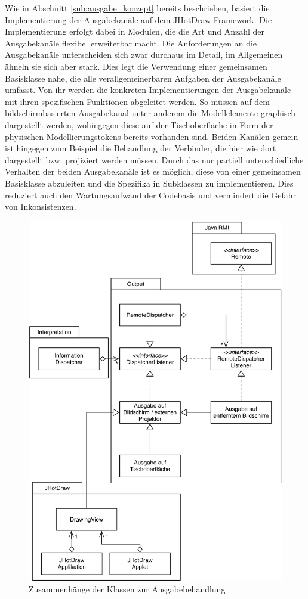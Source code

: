 Wie in Abschnitt \ref{sub:ausgabe_konzept} bereits beschrieben, basiert die Implementierung der Ausgabekanäle auf dem JHotDraw-Framework. Die Implementierung erfolgt dabei in Modulen, die die Art und Anzahl der Ausgabekanäle flexibel erweiterbar macht. Die Anforderungen an die Ausgabekanäle unterscheiden sich zwar durchaus im Detail, im Allgemeinen ähneln sie sich aber stark. Dies legt die Verwendung einer gemeinsamen Basisklasse nahe, die alle verallgemeinerbaren Aufgaben der Ausgabekanäle umfasst. Von ihr werden die konkreten Implementierungen der Ausgabekanäle mit ihren spezifischen Funktionen abgeleitet werden. So müssen auf dem bildschirmbasierten Ausgabekanal unter anderem die Modellelemente graphisch dargestellt werden, wohingegen diese auf der Tischoberfläche in Form der physischen Modellierungstokens bereits vorhanden sind. Beiden Kanälen gemein ist hingegen zum Beispiel die Behandlung der Verbinder, die hier wie dort dargestellt bzw. projiziert werden müssen. Durch das nur partiell unterschiedliche Verhalten der beiden Ausgabekanäle ist es möglich, diese von einer gemeinsamen Basisklasse abzuleiten und die Spezifika in Subklassen zu implementieren. Dies reduziert auch den Wartungsaufwand der Codebasis und vermindert die Gefahr von Inkonsistenzen. 

\begin{figure}[htbp]
	\centering
		\includegraphics[height=\textheight]{img/ImplementierungOutput/OutputClasses.png}
	\caption{Zusammenhänge der Klassen zur Ausgabebehandlung}
	\label{fig:img_ImplementierungOutput_OutputClasses}
\end{figure}

